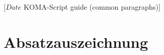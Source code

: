 %
%
%
%
%
%
%
%
% 
%
%
%
%

                 [$Date$
                  KOMA-Script guide (common paragraphs)]

\section{Absatzauszeichnung}
%
\BeginIndexGroup
{}%

